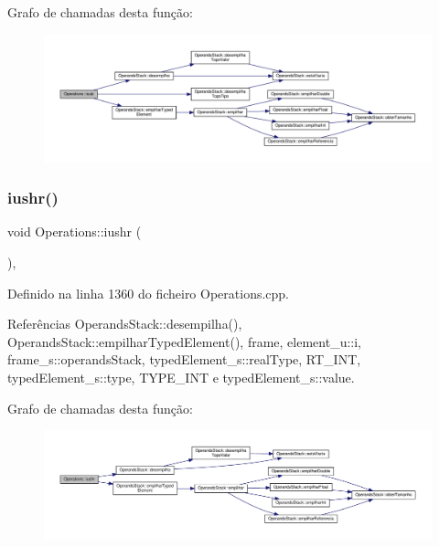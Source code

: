 Grafo de chamadas desta função\+:
\nopagebreak
\begin{figure}[H]
\begin{center}
\leavevmode
\includegraphics[width=350pt]{classOperations_ab2808e99336de64fefb2a9073bc251de_cgraph}
\end{center}
\end{figure}
\mbox{\label{classOperations_ae3ab5ae36e587a47832886fdf4f8b2a6}} 
\subsubsection{\texorpdfstring{iushr()}{iushr()}}
{\footnotesize\ttfamily void Operations\+::iushr (\begin{DoxyParamCaption}{ }\end{DoxyParamCaption})\hspace{0.3cm}{\ttfamily [static]}, {\ttfamily [private]}}



Definido na linha 1360 do ficheiro Operations.\+cpp.



Referências Operands\+Stack\+::desempilha(), Operands\+Stack\+::empilhar\+Typed\+Element(), frame, element\+\_\+u\+::i, frame\+\_\+s\+::operands\+Stack, typed\+Element\+\_\+s\+::real\+Type, R\+T\+\_\+\+I\+NT, typed\+Element\+\_\+s\+::type, T\+Y\+P\+E\+\_\+\+I\+NT e typed\+Element\+\_\+s\+::value.

Grafo de chamadas desta função\+:
\nopagebreak
\begin{figure}[H]
\begin{center}
\leavevmode
\includegraphics[width=350pt]{classOperations_ae3ab5ae36e587a47832886fdf4f8b2a6_cgraph}
\end{center}
\end{figure}
\mbox{\label{classOperations_abd0ce3453623b677de3af1f05bcf4b0b}} 
